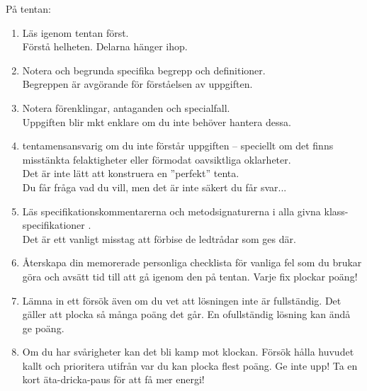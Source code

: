 \begin{Slide}{På tentan:} \SlideFontTiny
\begin{enumerate}
\item Läs igenom  tentan först. \\  Förstå helheten. Delarna hänger ihop.
\item Notera och begrunda specifika begrepp och definitioner. \\  Begreppen är avgörande för förståelsen av uppgiften.
\item Notera förenklingar, antaganden och specialfall. \\  Uppgiften blir mkt enklare om du inte behöver hantera dessa.
\item {} tentamensansvarig om du inte förstår uppgiften -- speciellt om det finns misstänkta felaktigheter eller förmodat oavsiktliga oklarheter. \\  Det är inte lätt att konstruera en ''perfekt'' tenta. \\ Du får fråga vad du vill, men det är inte säkert du får svar...
\item Läs specifikationskommentarerna och metodsignaturerna i alla givna klass-specifikationer . \\  Det är ett vanligt misstag att förbise de ledtrådar som ges där.
\item Återskapa din memorerade personliga checklista för vanliga fel som du brukar göra och avsätt tid till att gå igenom den på tentan. Varje fix plockar poäng!
\item Lämna in ett försök även om du vet att lösningen inte är fullständig. Det gäller att plocka så många poäng det går. En ofullständig lösning kan ändå ge poäng.

\item Om du har svårigheter kan det bli kamp mot klockan. Försök hålla huvudet kallt och prioritera utifrån var du kan plocka flest poäng. Ge inte upp! Ta en kort äta-dricka-paus för att få mer energi!

\end{enumerate}
\end{Slide}

\ifkompendium\else

